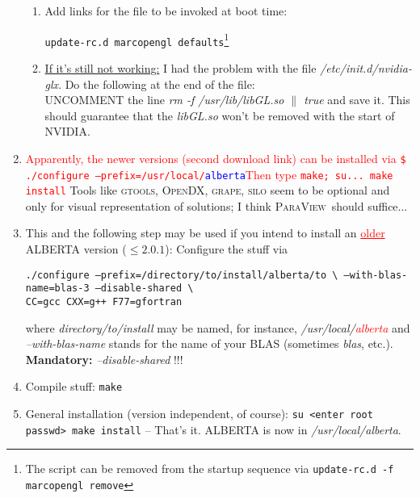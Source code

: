 \documentclass[a4paper,12pt]{article}
\newcommand{\paraview}{\textsc{ParaView}\ }
\newcommand{\dyeitred}{\textcolor{red}}{}
\begin{document}
\begin{enumerate}
{\begin{itemize}
\begin{enumerate}
    \item Add links for the file to be invoked at boot time:
      \begin{center}
        \texttt{update-rc.d marcopengl defaults}\footnote{The script can be removed from the startup sequence via \texttt{update-rc.d -f marcopengl remove}}
      \end{center}
      \item \underline{If it's still not working:} I had the problem with the file \textit{/etc/init.d/nvidia-glx}. Do the following at the end of the file:\\
UNCOMMENT the line \textit{rm -f  /usr/lib/libGL.so $\|$ true} and save it. This should guarantee that the \textit{libGL.so} won't be removed with the start of NVIDIA.
\end{enumerate}
\end{itemize} }
   \item \dyeitred{Apparently, the newer versions (second download link) can be installed  via \newline \texttt{\$ ./configure --prefix=/usr/local/\textcolor{blue}{alberta}}\newline Then type \texttt{make; su... make install}}\newline
    Tools like \textsc{gtools, OpenDX, grape, silo} seem to be optional and only for visual representation of solutions; I think \paraview should suffice...

 
 \item This and the following step may be used if you intend to install an \dyeitred{\underline{older}} \textsc{ALBERTA} version ($\leq 2.0.1$): Configure the stuff via \begin{center} \texttt{./configure --prefix=/directory/to/install/alberta/to \textbackslash
   --with-blas-name=blas-3 --disable-shared \textbackslash\\ 
  CC=gcc CXX=g++ F77=gfortran}
\end{center}
  where \textit{directory/to/install} may be named, for instance, 
   \textit{/usr/local/\dyeitred{alberta}} and \textit{--with-blas-name}
  stands for the name of your BLAS (sometimes \textit{blas}, etc.).\\
  \Stopsign \textbf{Mandatory:} \textit{--disable-shared} !!!
  \item Compile stuff: \texttt{make}
 \item General installation (version independent, of course): \texttt{su <enter root passwd>   make install}
 -- That's it. \textsc{ALBERTA} is now in \textit{/usr/local/alberta}.
\end{enumerate}
\end{document}
